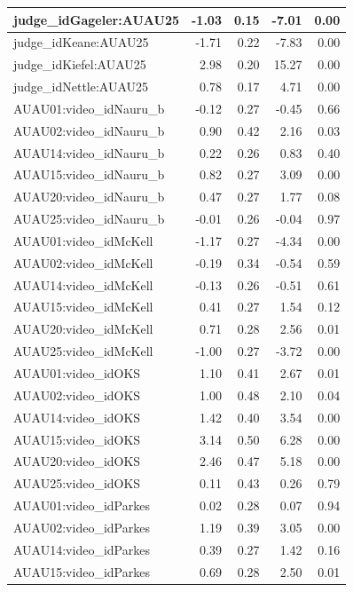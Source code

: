 \documentclass{monashthesis}
\begin{document}
\begin{tabular}{l|r|r|r|r}
\hline
judge\_idGageler:AUAU25 & -1.03 & 0.15 & -7.01 & 0.00\\
\hline
judge\_idKeane:AUAU25 & -1.71 & 0.22 & -7.83 & 0.00\\
\hline
judge\_idKiefel:AUAU25 & 2.98 & 0.20 & 15.27 & 0.00\\
\hline
judge\_idNettle:AUAU25 & 0.78 & 0.17 & 4.71 & 0.00\\
\hline
AUAU01:video\_idNauru\_b & -0.12 & 0.27 & -0.45 & 0.66\\
\hline
AUAU02:video\_idNauru\_b & 0.90 & 0.42 & 2.16 & 0.03\\
\hline
AUAU14:video\_idNauru\_b & 0.22 & 0.26 & 0.83 & 0.40\\
\hline
AUAU15:video\_idNauru\_b & 0.82 & 0.27 & 3.09 & 0.00\\
\hline
AUAU20:video\_idNauru\_b & 0.47 & 0.27 & 1.77 & 0.08\\
\hline
AUAU25:video\_idNauru\_b & -0.01 & 0.26 & -0.04 & 0.97\\
\hline
AUAU01:video\_idMcKell & -1.17 & 0.27 & -4.34 & 0.00\\
\hline
AUAU02:video\_idMcKell & -0.19 & 0.34 & -0.54 & 0.59\\
\hline
AUAU14:video\_idMcKell & -0.13 & 0.26 & -0.51 & 0.61\\
\hline
AUAU15:video\_idMcKell & 0.41 & 0.27 & 1.54 & 0.12\\
\hline
AUAU20:video\_idMcKell & 0.71 & 0.28 & 2.56 & 0.01\\
\hline
AUAU25:video\_idMcKell & -1.00 & 0.27 & -3.72 & 0.00\\
\hline
AUAU01:video\_idOKS & 1.10 & 0.41 & 2.67 & 0.01\\
\hline
AUAU02:video\_idOKS & 1.00 & 0.48 & 2.10 & 0.04\\
\hline
AUAU14:video\_idOKS & 1.42 & 0.40 & 3.54 & 0.00\\
\hline
AUAU15:video\_idOKS & 3.14 & 0.50 & 6.28 & 0.00\\
\hline
AUAU20:video\_idOKS & 2.46 & 0.47 & 5.18 & 0.00\\
\hline
AUAU25:video\_idOKS & 0.11 & 0.43 & 0.26 & 0.79\\
\hline
AUAU01:video\_idParkes & 0.02 & 0.28 & 0.07 & 0.94\\
\hline
AUAU02:video\_idParkes & 1.19 & 0.39 & 3.05 & 0.00\\
\hline
AUAU14:video\_idParkes & 0.39 & 0.27 & 1.42 & 0.16\\
\hline
AUAU15:video\_idParkes & 0.69 & 0.28 & 2.50 & 0.01\\

\end{tabular}
\end{document}

